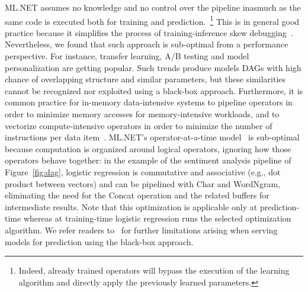 \documentclass[11pt]{article}
\newcommand{\mlnet}{ML.NET\xspace}
\newcommand{\stitle}[1]{\noindent{\bf #1}}
\begin{document}
\stitle{Limitations.} \mlnet assumes no knowledge and no control over the pipeline inasmuch as the same code is executed both for training and prediction.~\footnote{Indeed, already trained operators will bypass the execution of the learning algorithm and directly apply the previously learned parameters.}
This is in general good practice because it simplifies the process of training-inference skew debugging~\cite{google-rules-of-ml}.
Nevertheless, we found that such approach is sub-optimal from a performance perspective.
For instance, transfer learning, A/B testing and model personalization are getting popular. Such trends produce models DAGs with high chance of overlapping structure and similar parameters, but these similarities cannot be recognized nor exploited using a black-box approach.
Furthermore, it is common practice for in-memory data-intensive systems to pipeline operators in order to minimize memory accesses for memory-intensive workloads, and to vectorize compute-intensive operators in order to minimize the number of instructions per data item~\cite{tupleware,journals/debu/ZukowskiBNH05}. \mlnet's operator-at-a-time model~\cite{journals/debu/ZukowskiBNH05} is sub-optimal because computation is organized around logical operators, ignoring how those operators behave together: in the example of the sentiment analysis pipeline of Figure~\ref{fig:dag}, logistic regression is commutative and associative (e.g., dot product between vectors) and can be pipelined with Char and WordNgram, eliminating the need for the Concat operation and the related buffers for intermediate results.
Note that this optimization is applicable only at prediction-time whereas at training-time logistic regression runs the selected optimization algorithm.
We refer readers to~\cite{pretzel-osdi} for further limitations arising when serving models for prediction using the black-box approach.
   
\end{document}
